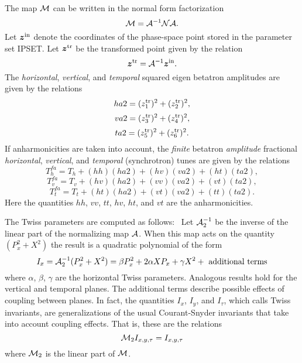The map ${\cal M}$ can be written in the normal form factorization
\begin{equation}
{\cal M} = {\cal A}^{-1} {\cal N} {\cal A}.
\end{equation}
Let $\mbox{\boldmath $z$}^{\rm in}$ denote the coordinates of the
phase-space point stored in the parameter set IPSET.  Let
$\mbox{\boldmath $z$}^{\rm tr}$ be the transformed point given by the
relation
\begin{equation}
\mbox{\boldmath $z$}^{\rm tr} = {\cal A}^{-1} \mbox{\boldmath $z$}^{\rm in}.
\end{equation}
The {\em horizontal}, {\em vertical}, and {\em temporal} squared eigen betatron
amplitudes are given by the relations
\begin{equation}
ha2 = (z^{\rm tr}_1)^2 + (z^{\rm tr}_2)^2,
\end{equation}
\begin{equation}
va2 = (z^{\rm tr}_3)^2 + (z^{\rm tr}_4)^2,
\end{equation}
\begin{equation}
ta2 = (z^{\rm tr}_5)^2 + (z^{\rm tr}_6)^2.
\end{equation}
If anharmonicities are taken into account, the {\em finite} betatron {\em
amplitude} fractional {\em horizontal}, {\em vertical}, and {\em
temporal} (synchrotron) tunes are given by the relations   
\begin{equation}
T^{fa}_h = T_h + (hh) (ha2) + (hv)(va2) + (ht)(ta2),
\end{equation}
\begin{equation}
T^{fa}_v = T_v + (hv) (ha2) + (vv)(va2) + (vt)(ta2),
\end{equation}
\begin{equation}
T^{fa}_t = T_t + (ht) (ha2) + (vt)(va2) + (tt)(ta2).
\end{equation}
Here the quantities $hh$, $vv$, $tt$, $hv$, $ht$, and $vt$ are the
anharmonicities. 

The Twiss parameters are computed as follows: \ Let ${\cal A}^{-1}_2$ be the inverse of the linear part of the normalizing map ${\cal A}$.  When this map acts on the quantity $(P^2_x + X^2)$ the result is a quadratic polynomial of the form
\begin{equation}
I_x = {\cal A}_2^{-1} (P^2_x + X^2) = \beta P^2_x + 2\alpha XP_x + \gamma X^2 + \ {\rm additional \ terms}
\end{equation}
where $\alpha$, $\beta$, $\gamma$ are the horizontal Twiss parameters.  Analogous results hold for the vertical and temporal planes.  The additional terms describe possible effects of coupling between planes.  In fact, the quantities $I_x$, $I_y$, and $I_{\tau}$, which \Mary calls Twiss invariants, are generalizations of the usual Courant-Snyder invariants that take into account coupling effects.  That is, these are the relations
\begin{equation}
{\cal M}_2 I_{x,y,\tau}  = I_{x,y,\tau}
\end{equation}
where ${\cal M}_2$ is the linear part of ${\cal M}$. 

